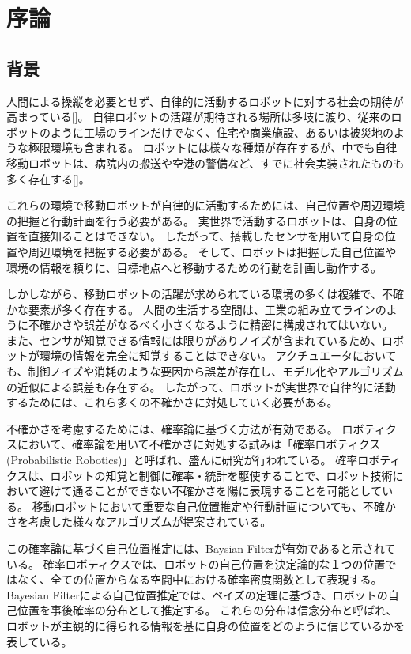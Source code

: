 \chapter{序論}


\section{背景} \label{section:backglound}

人間による操縦を必要とせず、自律的に活動するロボットに対する社会の期待が高まっている[]。
自律ロボットの活躍が期待される場所は多岐に渡り、従来のロボットのように工場のラインだけでなく、住宅や商業施設、あるいは被災地のような極限環境も含まれる。
ロボットには様々な種類が存在するが、中でも自律移動ロボットは、病院内の搬送や空港の警備など、すでに社会実装されたものも多く存在する[]。

これらの環境で移動ロボットが自律的に活動するためには、自己位置や周辺環境の把握と行動計画を行う必要がある。
実世界で活動するロボットは、自身の位置を直接知ることはできない。
したがって、搭載したセンサを用いて自身の位置や周辺環境を把握する必要がある。
そして、ロボットは把握した自己位置や環境の情報を頼りに、目標地点へと移動するための行動を計画し動作する。

しかしながら、移動ロボットの活躍が求められている環境の多くは複雑で、不確かな要素が多く存在する。
人間の生活する空間は、工業の組み立てラインのように不確かさや誤差がなるべく小さくなるように精密に構成されてはいない。
また、センサが知覚できる情報には限りがありノイズが含まれているため、ロボットが環境の情報を完全に知覚することはできない。
アクチュエータにおいても、制御ノイズや消耗のような要因から誤差が存在し、モデル化やアルゴリズムの近似による誤差も存在する。
したがって、ロボットが実世界で自律的に活動するためには、これら多くの不確かさに対処していく必要がある。

不確かさを考慮するためには、確率論に基づく方法が有効である。
ロボティクスにおいて、確率論を用いて不確かさに対処する試みは「確率ロボティクス(Probabilistic Robotics)」と呼ばれ、盛んに研究が行われている\cite{thrun2005,上田2007prob}。
確率ロボティクスは、ロボットの知覚と制御に確率・統計を駆使することで、ロボット技術において避けて通ることができない不確かさを陽に表現することを可能としている。
移動ロボットにおいて重要な自己位置推定や行動計画についても、不確かさを考慮した様々なアルゴリズムが提案されている。

この確率論に基づく自己位置推定には、Baysian Filterが有効であると示されている。
確率ロボティクスでは、ロボットの自己位置を決定論的な１つの位置ではなく、全ての位置からなる空間中における確率密度関数として表現する。
Bayesian Filterによる自己位置推定では、ベイズの定理に基づき、ロボットの自己位置を事後確率の分布として推定する。
これらの分布は信念分布と呼ばれ、ロボットが主観的に得られる情報を基に自身の位置をどのように信じているかを表している。

